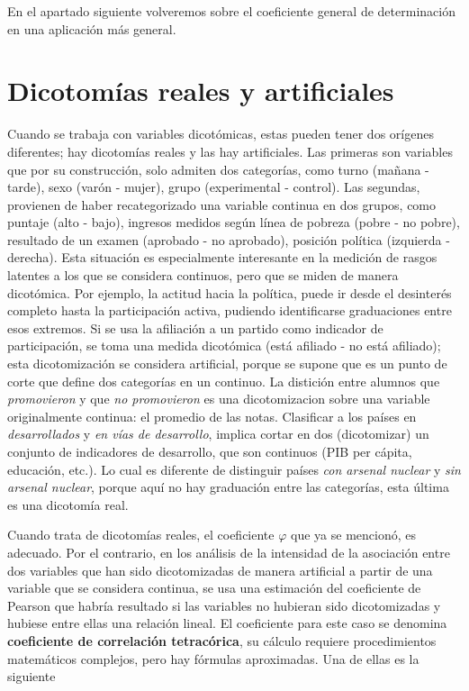 \documentclass[]{book}
\begin{document}
En el apartado siguiente volveremos sobre el coeficiente general de
determinación en una aplicación más general.

\hypertarget{dicotomuxedas-reales-y-artificiales}{%
\section{Dicotomías reales y artificiales}\label{dicotomuxedas-reales-y-artificiales}}

Cuando se trabaja con variables dicotómicas, estas pueden tener dos
orígenes diferentes; hay dicotomías reales y las hay artificiales. Las primeras son variables que por su construcción, solo admiten dos
categorías, como turno (mañana - tarde), sexo (varón - mujer), grupo
(experimental - control). Las segundas, provienen de haber
recategorizado una variable continua en dos grupos, como puntaje (alto - bajo), ingresos medidos según línea de pobreza (pobre - no pobre), resultado de un examen (aprobado - no aprobado), posición política (izquierda - derecha). Esta situación es especialmente interesante en la medición de rasgos latentes a los que se considera continuos, pero que se miden de manera dicotómica. Por ejemplo, la actitud hacia la política, puede ir desde el desinterés completo hasta la participación activa, pudiendo identificarse graduaciones entre esos extremos. Si se usa la afiliación a un partido como indicador de participación, se toma una medida dicotómica (está afiliado - no está afiliado); esta dicotomización se considera artificial, porque se supone que es un punto de corte que define dos categorías en un continuo. La distición entre alumnos que \emph{promovieron} y que \emph{no promovieron} es una dicotomizacion sobre una variable originalmente continua: el promedio de las notas. Clasificar a los países en \emph{desarrollados} y \emph{en vías de desarrollo}, implica cortar en dos (dicotomizar) un conjunto de indicadores de desarrollo, que son continuos (PIB per cápita, educación, etc.). Lo cual es diferente de distinguir países \emph{con arsenal nuclear} y \emph{sin arsenal nuclear}, porque aquí no hay graduación entre las categorías, esta última es una dicotomía real.

Cuando trata de dicotomías reales, el coeficiente \(\varphi\) que ya se mencionó, es adecuado. Por el contrario, en los análisis de la intensidad de la asociación entre dos variables que han sido dicotomizadas de manera artificial a partir de una variable que se considera continua, se usa una estimación del coeficiente de Pearson que habría resultado si las variables no hubieran sido dicotomizadas y hubiese entre ellas una
relación lineal. El coeficiente para este caso se denomina \textbf{coeficiente de correlación tetracórica}, su cálculo requiere procedimientos matemáticos complejos, pero hay fórmulas aproximadas. Una de ellas es la siguiente
\end{document}

